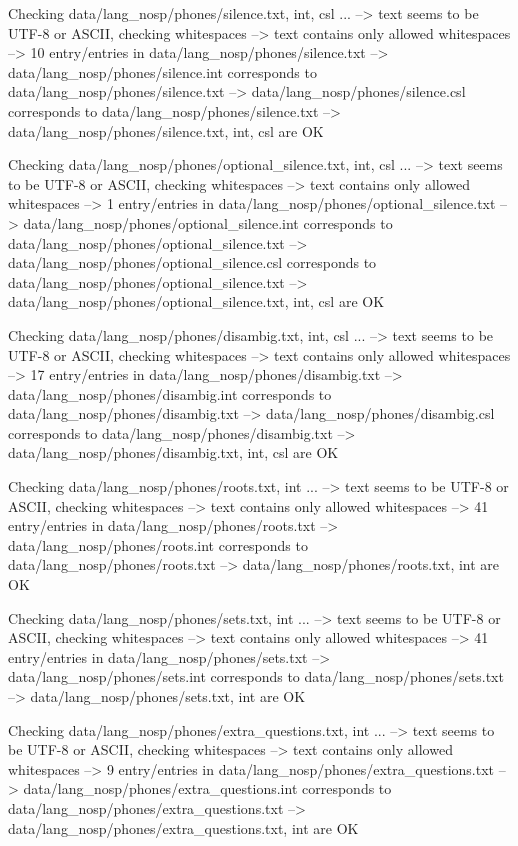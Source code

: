 Checking data/lang_nosp/phones/silence.{txt, int, csl} ...
--> text seems to be UTF-8 or ASCII, checking whitespaces
--> text contains only allowed whitespaces
--> 10 entry/entries in data/lang_nosp/phones/silence.txt
--> data/lang_nosp/phones/silence.int corresponds to data/lang_nosp/phones/silence.txt
--> data/lang_nosp/phones/silence.csl corresponds to data/lang_nosp/phones/silence.txt
--> data/lang_nosp/phones/silence.{txt, int, csl} are OK

Checking data/lang_nosp/phones/optional_silence.{txt, int, csl} ...
--> text seems to be UTF-8 or ASCII, checking whitespaces
--> text contains only allowed whitespaces
--> 1 entry/entries in data/lang_nosp/phones/optional_silence.txt
--> data/lang_nosp/phones/optional_silence.int corresponds to data/lang_nosp/phones/optional_silence.txt
--> data/lang_nosp/phones/optional_silence.csl corresponds to data/lang_nosp/phones/optional_silence.txt
--> data/lang_nosp/phones/optional_silence.{txt, int, csl} are OK

Checking data/lang_nosp/phones/disambig.{txt, int, csl} ...
--> text seems to be UTF-8 or ASCII, checking whitespaces
--> text contains only allowed whitespaces
--> 17 entry/entries in data/lang_nosp/phones/disambig.txt
--> data/lang_nosp/phones/disambig.int corresponds to data/lang_nosp/phones/disambig.txt
--> data/lang_nosp/phones/disambig.csl corresponds to data/lang_nosp/phones/disambig.txt
--> data/lang_nosp/phones/disambig.{txt, int, csl} are OK

Checking data/lang_nosp/phones/roots.{txt, int} ...
--> text seems to be UTF-8 or ASCII, checking whitespaces
--> text contains only allowed whitespaces
--> 41 entry/entries in data/lang_nosp/phones/roots.txt
--> data/lang_nosp/phones/roots.int corresponds to data/lang_nosp/phones/roots.txt
--> data/lang_nosp/phones/roots.{txt, int} are OK

Checking data/lang_nosp/phones/sets.{txt, int} ...
--> text seems to be UTF-8 or ASCII, checking whitespaces
--> text contains only allowed whitespaces
--> 41 entry/entries in data/lang_nosp/phones/sets.txt
--> data/lang_nosp/phones/sets.int corresponds to data/lang_nosp/phones/sets.txt
--> data/lang_nosp/phones/sets.{txt, int} are OK

Checking data/lang_nosp/phones/extra_questions.{txt, int} ...
--> text seems to be UTF-8 or ASCII, checking whitespaces
--> text contains only allowed whitespaces
--> 9 entry/entries in data/lang_nosp/phones/extra_questions.txt
--> data/lang_nosp/phones/extra_questions.int corresponds to data/lang_nosp/phones/extra_questions.txt
--> data/lang_nosp/phones/extra_questions.{txt, int} are OK

